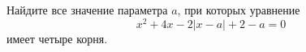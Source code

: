 \begin{ex}
	\begin{condition}
		Найдите все значение параметра \( a \), при которых уравнение
		\[ x^2+4x-2|x-a|+2-a=0 \]
		имеет четыре корня.
	\end{condition}
\end{ex}